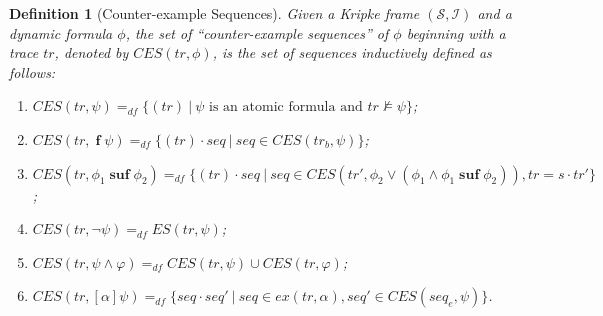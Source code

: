 \documentclass[manuscript,screen]{acmart}
\newtheorem{definition}{Definition}[section]
\newcommand{\mcl}[1]{\mathcal{#1}}
\newcommand{\la}[0]{\langle}
\newcommand{\ra}[0]{\rangle}
\newcommand{\dddef}[0]{=_{df}}
\newcommand{\EX}[0]{\textit{CES}}
\newcommand{\EXA}[0]{\textit{ES}}
\newcommand{\ex}[0]{\textit{ex}}
\newcommand{\mex}[0]{\textit{mex}}
\newcommand{\Wd}[0]{\mcl{S}}
\newcommand{\I}[0]{\mcl{I}}
\DeclareMathOperator{\ofst}{\mathbf{f}}
\DeclareMathOperator{\osuf}{\mathbf{suf}}
\newcommand{\str}[0]{str}
\newcommand{\CET}[0]{\textit{CT}}
\begin{document}
\ifx
\begin{definition}[Counter-example Sequences]
    \label{def:Minimum Counter-example Traces}
    Given a Kripke frame $(\Wd, \I)$ and a dynamic formula $\phi$, the set of ``counter-example sequences'' of $\phi$ beginning with a trace $tr$, denoted by $\EX(tr, \phi)$, is the set of sequences inductively defined as follows:
    \begin{enumerate}
        \item $\EX(tr, \psi)\dddef \{(tr)\ |\ \mbox{$\psi$ is an atomic formula and $tr\not\models \psi$}\}$; 
        \item $\EX(tr, \ofst\psi)\dddef \{(tr)\cdot seq\ |\ seq\in \EX(tr_b, \psi)\}$;
        \item $\EX(tr, \phi_1\osuf \phi_2)\dddef \{(tr)\cdot seq\ |\ seq\in \EX(tr', \phi_2\vee (\phi_1\wedge \phi_1\osuf\phi_2)), tr = s\cdot tr'\}$;
        \item $\EX(tr, \neg\psi) \dddef \EXA(tr, \psi)$;
        \item $\EX(tr, \psi\wedge \varphi)\dddef \EX(tr, \psi)\cup \EX(tr, \varphi)$;
        \item $\EX(tr, [\alpha]\psi)\dddef \{seq\cdot seq'\ |\ seq\in \ex(tr, \alpha), seq'\in \EX(seq_e, \psi)\}$.

\end{enumerate}
\end{definition}
\end{document}
